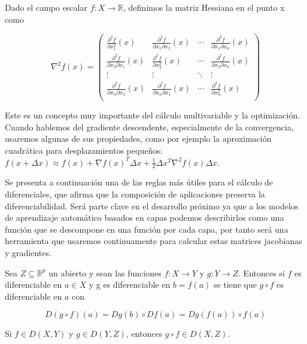 \begin{definicion}
	Dado el campo escalar $f: X \rightarrow \mathbb{R}$, definimos la matriz Hessiana en el punto x como

	$$\nabla^2f(x)= \begin{pmatrix}
		\frac{\partial^2f}{\partial x^{2}_1}(x) & \frac{\partial^2f}{\partial x_1\partial x_2}(x) & \cdots & \frac{\partial^2f}{\partial x_1 \partial x_n}(x)\\
		\frac{\partial^2f}{\partial x_2 \partial x_1}(x) & \frac{\partial^2f}{\partial x^{2}_2}(x) & \cdots & \frac{\partial^2f}{\partial x_2 \partial x_n}(x)\\
		\vdots & \vdots & \ddots & \vdots \\
		\frac{\partial^2f}{\partial x_n \partial x_1}(x) & \frac{\partial^2f}{\partial x_n \partial x_1}(x) & \cdots & \frac{\partial^2f}{\partial x^{2}_n}(x)\\
	\end{pmatrix}$$

\end{definicion}

Este es un concepto muy importante del cálculo multivariable y la optimización. Cuando hablemos del gradiente descendente, especialmente de la convergencia, usaremos algunas de sus propiedades, como por ejemplo la aproximación cuadrática para desplazamientos pequeños: $f(x + \Delta x) \approx f(x) + \nabla f(x)^T \Delta x + \frac{1}{2} \Delta x^T \nabla^2 f(x) \Delta x$. %
		


Se presenta a continuación una de las reglas más útiles para el cálculo de diferenciales, que afirma que la composición de aplicaciones preserva la diferenciabilidad. Será parte clave en el desarrollo próximo ya que a los modelos de aprendizaje automático basados en capas podemos describirlos como una función que se descompone en una función por cada capa, por tanto será una herramienta que usaremos continuamente para calcular estas matrices jacobianas y gradientes.

\begin{teorema}
    Sea $Z \subseteq \mathbb{R}^p$ un abierto y sean las funciones $f:X \rightarrow Y$ y $g:Y \rightarrow Z$. Entonces si $f$ es diferenciable en $a \in X$ y g es diferenciable en $b=f(a)$ se tiene que $g \circ f$ es diferenciable en $a$ con

    $$D(g \circ f)(a) = Dg(b) \circ Df(a) = Dg(f(a)) \circ f(a)$$

    \raggedright{Si $f \in D(X, Y)$ y  $g \in D(Y,Z)$, entonces $g \circ f \in D(X, Z)$.}
    
\end{teorema}


